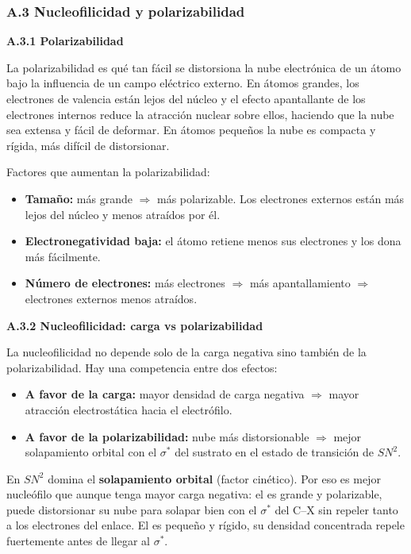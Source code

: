 \label{sec:anexo:nucleofilicidad}
\subsubsection*{\textcolor{blueunam}{A.3 Nucleofilicidad y polarizabilidad}}

\label{sec:anexo:nucleofilicidad:polar}
\textbf{A.3.1 Polarizabilidad}

La polarizabilidad es qué tan fácil se distorsiona la nube electrónica de 
un átomo bajo la influencia de un campo eléctrico externo. En átomos grandes, 
los electrones de valencia están lejos del núcleo y el efecto apantallante 
de los electrones internos reduce la atracción nuclear sobre ellos, haciendo 
que la nube sea extensa y fácil de deformar. En átomos pequeños la nube es 
compacta y rígida, más difícil de distorsionar.

Factores que aumentan la polarizabilidad:
\begin{itemize}
\item \textbf{Tamaño:} más grande $\Rightarrow$ más polarizable. 
Los electrones externos están más lejos del núcleo y menos atraídos por él.
\item \textbf{Electronegatividad baja:} el átomo retiene menos sus electrones 
y los dona más fácilmente.
\item \textbf{Número de electrones:} más electrones $\Rightarrow$ más 
apantallamiento $\Rightarrow$ electrones externos menos atraídos.
\end{itemize}

\label{sec:anexo:nucleofilicidad:carga}
\textbf{A.3.2 Nucleofilicidad: carga vs polarizabilidad}

La nucleofilicidad no depende solo de la carga negativa sino también de la 
polarizabilidad. Hay una competencia entre dos efectos:

\begin{itemize}
\item \textbf{A favor de la carga:} mayor densidad de carga negativa 
$\Rightarrow$ mayor atracción electrostática hacia el electrófilo.
\item \textbf{A favor de la polarizabilidad:} nube más distorsionable 
$\Rightarrow$ mejor solapamiento orbital con el $\sigma^*$ del sustrato 
en el estado de transición de $SN^2$.
\end{itemize}

En $SN^2$ domina el \textbf{solapamiento orbital} (factor cinético). 
Por eso  es mejor nucleófilo que  aunque  tenga 
mayor carga negativa: el  es grande y polarizable, puede 
distorsionar su nube para solapar bien con el $\sigma^*$ del C--X 
sin repeler tanto a los electrones del enlace. El  es pequeño 
y rígido, su densidad concentrada repele fuertemente antes de llegar 
al $\sigma^*$.

